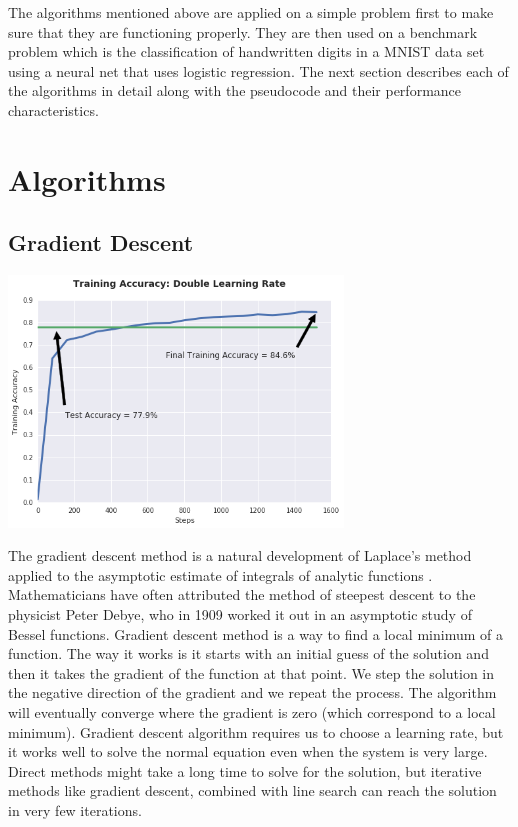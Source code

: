 \documentclass[10pt,twocolumn]{article}
\begin{document}
The algorithms mentioned above are applied on a simple problem first to make sure that they are functioning properly. They are then used on a benchmark problem which is the classification of handwritten digits in a MNIST data set using a neural net that uses logistic regression. The next section describes each of the algorithms in detail along with the pseudocode and their performance characteristics. 

\section{Algorithms}

\subsection{Gradient Descent}
	\includegraphics[width=3.5in]{plot1-GradDescent.png}

The gradient descent method is a natural development of Laplace's method applied to the asymptotic estimate of integrals of analytic functions \cite{petrova1997origin}. Mathematicians have often attributed the method of steepest descent to the physicist Peter Debye, who in 1909 worked it out in an asymptotic study of Bessel functions. Gradient descent method is a way to find a local minimum of a function\cite{petrova1997origin}. The way it works is it starts with an initial guess of the solution and then it takes the gradient of the function at that point. We step the solution in the negative direction of the gradient and we repeat the process. The algorithm will eventually converge where the gradient is zero (which correspond to a local minimum). Gradient descent algorithm requires us to choose a learning rate, but it works well to solve the normal equation even when the system is very large. Direct methods might take a long time to solve for the solution, but iterative methods like gradient descent, combined with line search can reach the solution in very few iterations. 
\end{document}
